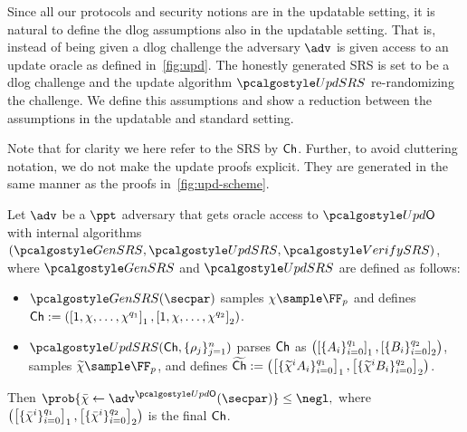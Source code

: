  Since all our protocols and security notions are in the updatable setting, it is natural to define the dlog assumptions also in the updatable setting. That is, instead of being given a dlog challenge the adversary $\adv$ is given access to an update oracle as defined in~\cref{fig:upd}. The honestly generated SRS is set to be a dlog challenge and the update algorithm $\upd$ re-randomizing the challenge. We define this assumptions and show a reduction between the assumptions in the updatable and standard setting. 

Note that for clarity we here refer to the SRS by $\mathsf{Ch}$. Further, to avoid cluttering notation, we do not make the update proofs explicit. They are generated in the same manner as the proofs in~\cref{fig:upd-scheme}.
	

\begin{definition}\label{def:udlog}
	Let $\adv$ be a $\ppt$ adversary that gets oracle access to $\initU$ with internal algorithms $(\kgen, \upd, \verifyCRS)$, where $\kgen$ and $\upd$ are defined as follows:
	\begin{itemize}
	\item $\kgen(\secpar)$ samples $\chi \sample \FF_p$ and defines 
		$\mathsf{Ch}:=(\left[1, \chi, \ldots,
			\chi^{q_1}\right]_{1}, \left[1, \chi, \ldots, \chi^{q_2}
		\right]_{2})$.
	\item $\upd(\Ch, \{\rho_j \}_{j=1}^n)$ 
	parses $\mathsf{Ch}$ as $\left( \left[\{A_i\}_{i = 0}^{q_1}\right]_{1},
	\left[\{B_i\}_{i = 0}^{q_2}\right]_{2} \right)$, samples
	$\widetilde{\chi} \sample \FF_p$, and defines
	$\widetilde{\mathsf{Ch}} := 
	\left( \left[\{\widetilde{\chi}^i A_i\}_{i = 0}^{q_1}\right]_{1},
	\left[\{\widetilde{\chi}^i B_i\}_{i = 0}^{q_2}\right]_{2} \right)$.
	\end{itemize}
	Then
	$
	\prob{\bar{\chi} \gets \adv^{\initU}(\secpar)} \leq \negl,
	$
	where $\left( \left[\{\bar{\chi}^i\}_{i = 0}^{q_1}\right]_{1},
	\left[\{\bar{\chi}^i\}_{i = 0}^{q_2}\right]_{2} \right)$ is the final $\mathsf{Ch}$.
\end{definition}



